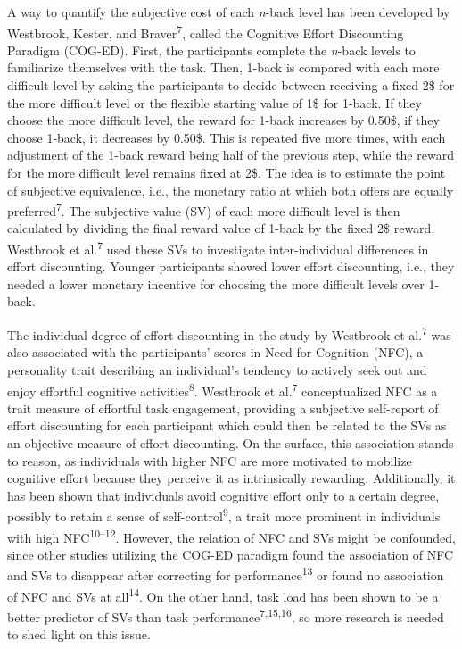 \documentclass[
  man,floatsintext]{apa6}
\begin{document}
A way to quantify the subjective cost of each \emph{n}-back level has been developed by Westbrook, Kester, and Braver\textsuperscript{7}, called the Cognitive Effort Discounting Paradigm (COG-ED).
First, the participants complete the \emph{n}-back levels to familiarize themselves with the task.
Then, 1-back is compared with each more difficult level by asking the participants to decide between receiving a fixed 2\$ for the more difficult level or the flexible starting value of 1\$ for 1-back.
If they choose the more difficult level, the reward for 1-back increases by 0.50\$, if they choose 1-back, it decreases by 0.50\$.
This is repeated five more times, with each adjustment of the 1-back reward being half of the previous step, while the reward for the more difficult level remains fixed at 2\$.
The idea is to estimate the point of subjective equivalence, i.e., the monetary ratio at which both offers are equally preferred\textsuperscript{7}.
The subjective value (SV) of each more difficult level is then calculated by dividing the final reward value of 1-back by the fixed 2\$ reward.
Westbrook et al.\textsuperscript{7} used these SVs to investigate inter-individual differences in effort discounting.
Younger participants showed lower effort discounting, i.e., they needed a lower monetary incentive for choosing the more difficult levels over 1-back.

The individual degree of effort discounting in the study by Westbrook et al.\textsuperscript{7} was also associated with the participants' scores in Need for Cognition (NFC), a personality trait describing an individual's tendency to actively seek out and enjoy effortful cognitive activities\textsuperscript{8}.
Westbrook et al.\textsuperscript{7} conceptualized NFC as a trait measure of effortful task engagement, providing a subjective self-report of effort discounting for each participant which could then be related to the SVs as an objective measure of effort discounting.
On the surface, this association stands to reason, as individuals with higher NFC are more motivated to mobilize cognitive effort because they perceive it as intrinsically rewarding.
Additionally, it has been shown that individuals avoid cognitive effort only to a certain degree, possibly to retain a sense of self-control\textsuperscript{9}, a trait more prominent in individuals with high NFC\textsuperscript{10--12}.
However, the relation of NFC and SVs might be confounded, since other studies utilizing the COG-ED paradigm found the association of NFC and SVs to disappear after correcting for performance\textsuperscript{13} or found no association of NFC and SVs at all\textsuperscript{14}.
On the other hand, task load has been shown to be a better predictor of SVs than task performance\textsuperscript{7,15,16}, so more research is needed to shed light on this issue.
\end{document}
